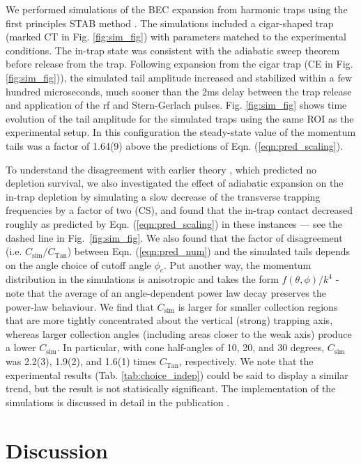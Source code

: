 	We performed simulations of the BEC expansion from harmonic traps using the first principles STAB method \cite{Deuar11,Kheruntsyan12}. 
	The simulations included a cigar-shaped trap (marked CT in Fig. \ref{fig:sim_fig}) with parameters matched to the experimental conditions. 
	The in-trap state was consistent with the adiabatic sweep theorem before release from the trap. 
	Following expansion from the cigar trap (CE in Fig. \ref{fig:sim_fig})), the simulated tail amplitude increased and stabilized within a few hundred microseconds, much sooner than the 2ms delay between the trap release and application of the rf and Stern-Gerlach pulses. 
	Fig. \ref{fig:sim_fig} shows time evolution of the tail amplitude for the simulated traps using the same ROI as the experimental setup.  
	In this configuration the steady-state value of the momentum tails was a factor of 1.64(9) above the predictions of Eqn. (\ref{eqn:pred_scaling}). 

	To understand the disagreement with earlier theory \cite{Qu16}, which predicted no depletion survival, we also investigated the effect of adiabatic expansion on the in-trap depletion by simulating a slow decrease of the transverse trapping frequencies by a factor of two (CS), and found that the in-trap contact decreased roughly as predicted by Eqn. (\ref{eqn:pred_scaling}) in these instances --- see the dashed line in Fig.~\ref{fig:sim_fig}. 
	We also found that the factor of disagreement (i.e. $C_\textrm{sim}/C_\textrm{Tan}$) between Eqn. (\ref{eqn:pred_num}) and the simulated tails depends on the angle choice of cutoff angle $\phi_c$. 
	Put another way, the momentum distribution in the simulations is anisotropic and takes the form $f(\theta,\phi)/k^4$ - note that the average of an angle-dependent power law decay preserves the power-law behaviour.
	We find that $C_\textrm{sim}$ is larger for smaller collection regions that are more tightly concentrated about the vertical (strong) trapping axis, whereas larger collection angles (including areas closer to the weak axis) produce a lower $C_\textrm{sim}$.
	In particular, with cone half-angles of 10, 20, and 30 degrees, $C_\textrm{sim}$ was 2.2(3), 1.9(2), and 1.6(1) times $C_\textrm{Tan}$, respectively.
	We note that the experimental results (Tab. \ref{tab:choice_indep}) could be said to display a similar trend, but the result is not statisically significant.
	The implementation of the simulations is discussed in detail in the publication \cite{Ross21}.


\section{Discussion}
\label{sec:discussion}

